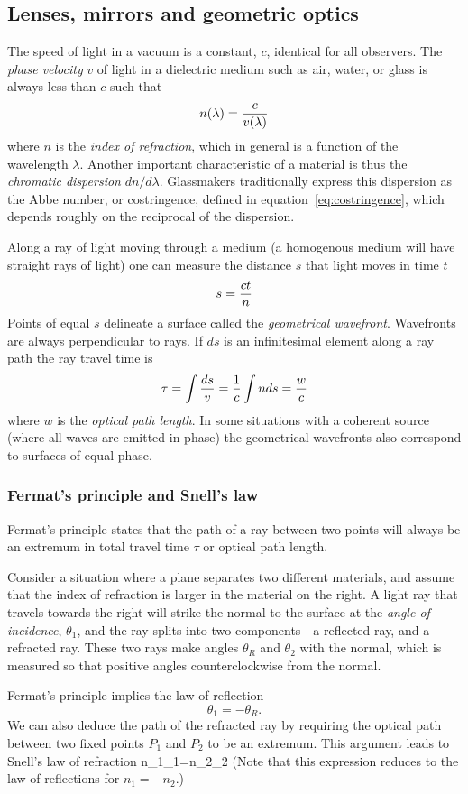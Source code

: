 \subsection{Lenses, mirrors and geometric optics}

The speed of light in a vacuum is a constant, $c$, identical for all observers. 
The {\it phase velocity} $v$ of light in a dielectric medium such as air, water, or glass
is always less than $c$ such that
\[
n(\lambda)={c\over v(\lambda)}
\]
where $n$ is the {\it index of refraction}, which in general is a function of the 
wavelength $\lambda$. Another important characteristic of a material is thus the 
{\it chromatic dispersion} $dn/d\lambda$. Glassmakers traditionally express this
dispersion as the Abbe number, or costringence, defined in equation~\ref{eq:costringence}, 
which depends roughly on the reciprocal of the dispersion.

Along a ray of light moving through a medium (a homogenous medium will have straight rays
of light) one can measure the distance $s$ that light moves in time $t$
\[
s={ct\over n}
\]
Points of equal $s$ delineate a surface called the {\it geometrical wavefront}. Wavefronts
are always perpendicular to rays. If $ds$ is an infinitesimal element along a ray path the
ray travel time is 
\[
\tau=\int{ds\over v}={1\over c}\int nds={w\over c}
\]
where $w$ is the {\it optical path length}. In some situations with a coherent source (where
all waves are emitted in phase) the geometrical wavefronts also correspond to surfaces of
equal phase.

\subsubsection{Fermat's principle and Snell's law}

Fermat's principle states that the path of a ray between two points will always be an extremum
in total travel time $\tau$ or optical path length.

 Consider a situation where a plane separates
two different materials, and assume that the index of refraction is larger in the material on the
right. A light ray that travels towards the right will strike the normal to the surface at the 
{\it angle of incidence}, $\theta_1$, and the ray splits into two components - a reflected ray, 
and a refracted ray. These two rays make angles $\theta_R$ and $\theta_2$ with the normal, 
which is measured so that positive angles counterclockwise from the normal. 

Fermat's principle implies the law of reflection
\[
\theta_1=-\theta_R.
\]
We can also deduce the path of the refracted ray by requiring the optical path between two
fixed points $P_1$ and $P_2$ to be an extremum. This argument leads to Snell's law of 
refraction
\be
n_1\sin\theta_1=n_2\sin\theta_2
\label{eq:snell}
\ee
(Note that this expression reduces to the law of reflections for
$n_1=-n_2$.) 


